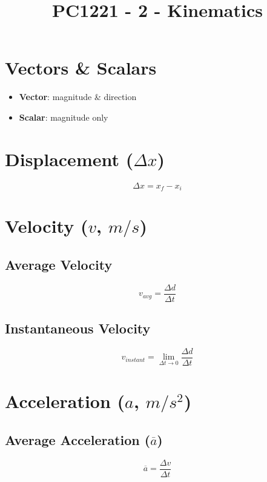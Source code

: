 \documentclass[12pt]{article}
\title{\textbf{PC1221 - 2 - Kinematics}}
\date{}
\begin{document}
\maketitle

\begin{spacing}{1.5}

\section{Vectors \& Scalars}

\begin{itemize}
	\item \textbf{Vector}: magnitude \& direction
	\item \textbf{Scalar}: magnitude only 
\end{itemize} 

\section{Displacement ($\Delta x$)}

$$\Delta x = x_f - x_i$$

\section{Velocity ($v$, $m/s$)}

\subsection{Average Velocity}

$$v_{avg} = \frac{\Delta d}{\Delta t}$$

\subsection{Instantaneous Velocity}

$$v_{instant} = \lim_{\Delta t \rightarrow 0} \frac{\Delta d}{\Delta t}$$

\section{Acceleration ($a$, $m/s^2$)}

\subsection{Average Acceleration ($\overline{a}$)}

$$\overline{a} = \frac{\Delta v}{\Delta t}$$


\end{spacing}
\end{document}
